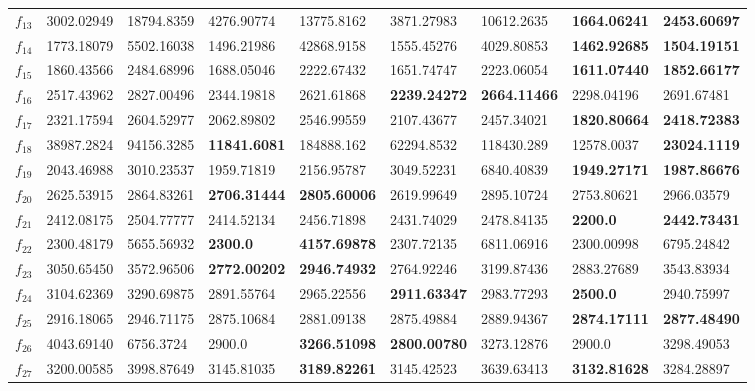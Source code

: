 \begin{table*}[t!]
\begin{tabular}{|p{0.8cm}|p{1.6cm}|p{1.6cm}|p{1.6cm}|p{1.6cm}|p{1.6cm}|p{1.6cm}|p{1.6cm}|p{1.6cm}|}
$f_{13}$  & 3002.02949 & 18794.8359 & 4276.90774 & 13775.8162 & 3871.27983 & 10612.2635 & \textbf{1664.06241} & \textbf{2453.60697} \\ 
$f_{14}$  & 1773.18079 & 5502.16038 & 1496.21986 & 42868.9158 & 1555.45276 & 4029.80853 & \textbf{1462.92685} & \textbf{1504.19151} \\ 
$f_{15}$  & 1860.43566 & 2484.68996 & 1688.05046 & 2222.67432 & 1651.74747 & 2223.06054 & \textbf{1611.07440} & \textbf{1852.66177} \\ 
$f_{16}$  & 2517.43962 & 2827.00496 & 2344.19818 & 2621.61868 & \textbf{2239.24272} & \textbf{2664.11466} & 2298.04196 & 2691.67481 \\ 
$f_{17}$  & 2321.17594 & 2604.52977 & 2062.89802 & 2546.99559 & 2107.43677 & 2457.34021 & \textbf{1820.80664} & \textbf{2418.72383} \\ 
$f_{18}$  & 38987.2824 & 94156.3285 & \textbf{11841.6081} & 184888.162 & 62294.8532 & 118430.289 & 12578.0037 & \textbf{23024.1119} \\ 
$f_{19}$  & 2043.46988 & 3010.23537 & 1959.71819 & 2156.95787 & 3049.52231 & 6840.40839 & \textbf{1949.27171} & \textbf{1987.86676} \\ 
$f_{20}$  & 2625.53915 & 2864.83261 & \textbf{2706.31444} & \textbf{2805.60006} & 2619.99649 & 2895.10724 & 2753.80621 & 2966.03579 \\ 
$f_{21}$  & 2412.08175 & 2504.77777 & 2414.52134 & 2456.71898 & 2431.74029 & 2478.84135 & \textbf{2200.0} & \textbf{2442.73431} \\ 
$f_{22}$  & 2300.48179 & 5655.56932 & \textbf{2300.0} & \textbf{4157.69878} & 2307.72135 & 6811.06916 & 2300.00998 & 6795.24842 \\ 
$f_{23}$  & 3050.65450 & 3572.96506 & \textbf{2772.00202} & \textbf{2946.74932} & 2764.92246 & 3199.87436 & 2883.27689 & 3543.83934 \\ 
$f_{24}$  & 3104.62369 & 3290.69875 & 2891.55764 & 2965.22556 & \textbf{2911.63347} & 2983.77293 & \textbf{2500.0} & 2940.75997 \\ 
$f_{25}$  & 2916.18065 & 2946.71175 & 2875.10684 & 2881.09138 & 2875.49884 & 2889.94367 & \textbf{2874.17111} & \textbf{2877.48490} \\ 
$f_{26}$  & 4043.69140 & 6756.3724 & 2900.0 & \textbf{3266.51098} & \textbf{2800.00780} & 3273.12876 & 2900.0 & 3298.49053 \\ 
$f_{27}$  & 3200.00585 & 3998.87649 & 3145.81035 & \textbf{3189.82261} & 3145.42523 & 3639.63413 & \textbf{3132.81628} & 3284.28897 \\ 

\end{tabular}
\end{table*}
